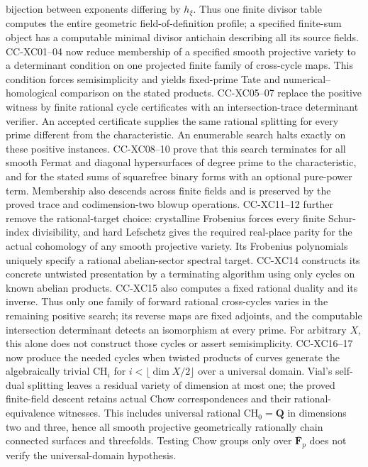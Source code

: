 \begin{description}[style=nextline,leftmargin=0pt]
bijection between exponents differing by $h_\xi$. Thus one finite
divisor table computes the entire geometric field-of-definition
profile; a specified finite-sum object has a computable minimal
divisor antichain describing all its source fields.
CC-XC01--04 now reduce membership of a specified smooth projective
variety to a determinant condition on one projected finite family
of cross-cycle maps. This condition forces semisimplicity and yields
fixed-prime Tate and numerical--homological comparison on the stated
products. CC-XC05--07 replace the positive witness by finite rational
cycle certificates with an intersection-trace determinant verifier.
An accepted certificate supplies the same rational splitting for
every prime different from the characteristic. An enumerable search
halts exactly on these positive instances. CC-XC08--10 prove that this
search terminates for all smooth Fermat and diagonal hypersurfaces of
degree prime to the characteristic, and for the stated sums of
squarefree binary forms with an optional pure-power term. Membership
also descends across finite fields and is preserved by the proved
trace and codimension-two blowup operations. CC-XC11--12 further
remove the rational-target choice: crystalline Frobenius forces every
finite Schur-index divisibility, and hard Lefschetz gives the required
real-place parity for the actual cohomology of any smooth projective
variety. Its Frobenius polynomials uniquely specify a rational
abelian-sector spectral target. CC-XC14 constructs its concrete untwisted presentation by a terminating
algorithm using only cycles on known abelian products. CC-XC15 also
computes a fixed rational duality and its inverse. Thus only one family
of forward rational cross-cycles varies in the remaining positive
search; its reverse maps are fixed adjoints, and the computable
intersection determinant detects an isomorphism at every prime.
For arbitrary $X$, this alone does not construct those cycles or
assert semisimplicity. CC-XC16--17 now produce the needed cycles when
twisted products of curves generate the algebraically trivial
$\mathrm{CH}_i$ for $i<\lfloor\dim X/2\rfloor$ over a universal
domain. Vial's self-dual splitting leaves a residual variety of
dimension at most one; the proved finite-field descent retains actual
Chow correspondences and their rational-equivalence witnesses. This
includes universal rational $\mathrm{CH}_0=\mathbf Q$ in dimensions
two and three, hence all smooth projective geometrically rationally
chain connected surfaces and threefolds. Testing Chow groups only over
$\overline{\mathbf F}_p$ does not verify the universal-domain hypothesis.

\end{description}
